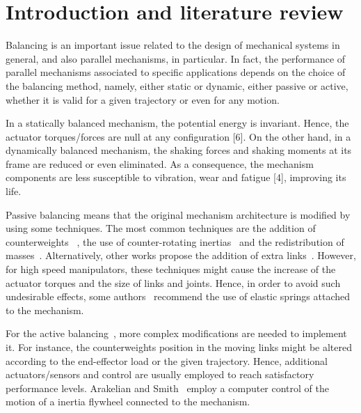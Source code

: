 \section{Introduction and literature review}\label{S01}

Balancing is an important issue related to the design of mechanical systems in general,
and also parallel mechanisms, in particular. In fact, the performance of parallel mechanisms
associated to specific applications depends on the choice of the balancing method, namely, 
either static or dynamic, either passive or active, whether it is valid for a given trajectory
or even for any motion.

In a statically balanced mechanism, the potential energy is invariant. Hence,
the actuator torques/forces are null at any configuration [6].
On the other hand, in a dynamically balanced mechanism, the shaking forces and
shaking moments at its frame are reduced or even eliminated. As a consequence, 
the mechanism components are less susceptible to vibration, wear and fatigue [4],
improving its life.

Passive balancing means that the original mechanism
architecture is modified by using some techniques.
The most common techniques are
the addition of counterweights
~\cite{1wijk,2arakelian,3seo,4wu,6wang,7wang,12russo,15coelho,16moradi}, 
the use of counter-rotating inertias~\cite{2arakelian,4wu,15coelho,16moradi} 
and the redistribution of masses~\cite{8alici,9alici}.
Alternatively, other works propose the addition of extra
links~\cite{5gosselin,12russo,13agrawal}.
However, for high speed manipulators, these techniques might cause the increase of the actuator
torques and the size of links and joints.
Hence, in order to avoid such undesirable effects, some 
authors~\cite{6wang,7wang,8alici,9alici,10dehkordi,13agrawal} recommend the use of
 elastic springs attached to the mechanism.

For the active balancing~\cite{2arakelian,3seo,11wang,14briot,15coelho,16moradi}, 
more complex modifications are needed to implement it. 
For instance, the counterweights position in the moving links might be altered
according to the end-effector load or the given trajectory. Hence, 
additional actuators/sensors and control are usually employed to reach satisfactory performance levels. Arakelian and Smith~\cite{2arakelian} employ a computer control of the motion of a inertia flywheel connected to the mechanism.

